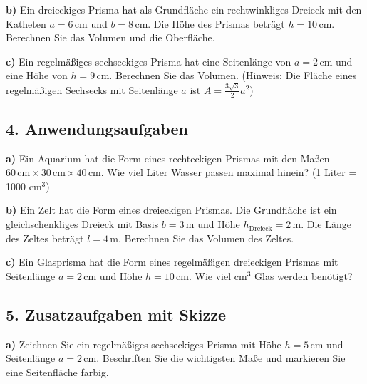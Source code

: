 \textbf{b)} Ein dreieckiges Prisma hat als Grundfläche ein rechtwinkliges Dreieck mit den Katheten $a=6\,\mathrm{cm}$ und $b=8\,\mathrm{cm}$. Die Höhe des Prismas beträgt $h=10\,\mathrm{cm}$. Berechnen Sie das Volumen und die Oberfläche.

\textbf{c)} Ein regelmäßiges sechseckiges Prisma hat eine Seitenlänge von $a=2\,\mathrm{cm}$ und eine Höhe von $h=9\,\mathrm{cm}$. Berechnen Sie das Volumen. (Hinweis: Die Fläche eines regelmäßigen Sechsecks mit Seitenlänge $a$ ist $A=\frac{3\sqrt{3}}{2}a^2$)

\subsection*{4. Anwendungsaufgaben}
\textbf{a)} Ein Aquarium hat die Form eines rechteckigen Prismas mit den Maßen $60\,\mathrm{cm} \times 30\,\mathrm{cm} \times 40\,\mathrm{cm}$. Wie viel Liter Wasser passen maximal hinein? (1 Liter = 1000 $\mathrm{cm}^3$)

\textbf{b)} Ein Zelt hat die Form eines dreieckigen Prismas. Die Grundfläche ist ein gleichschenkliges Dreieck mit Basis $b=3\,\mathrm{m}$ und Höhe $h_\text{Dreieck}=2\,\mathrm{m}$. Die Länge des Zeltes beträgt $l=4\,\mathrm{m}$. Berechnen Sie das Volumen des Zeltes.

\textbf{c)} Ein Glasprisma hat die Form eines regelmäßigen dreieckigen Prismas mit Seitenlänge $a=2\,\mathrm{cm}$ und Höhe $h=10\,\mathrm{cm}$. Wie viel $\mathrm{cm}^3$ Glas werden benötigt?

\subsection*{5. Zusatzaufgaben mit Skizze}
\textbf{a)} Zeichnen Sie ein regelmäßiges sechseckiges Prisma mit Höhe $h=5\,\mathrm{cm}$ und Seitenlänge $a=2\,\mathrm{cm}$. Beschriften Sie die wichtigsten Maße und markieren Sie eine Seitenfläche farbig.

\begin{center}
\end{center}

